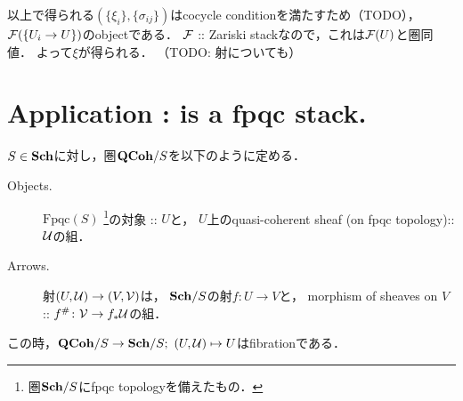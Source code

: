 \documentclass[a4paper, dvipdfmx]{jsarticle}
\begin{document}
    以上で得られる$(\{\xi_i\}, \{\sigma_{ij}\})$はcocycle conditionを満たすため（TODO），
    $\mathcal{F}(\{U_i \to U\})$のobjectである．
    $\mathcal{F}$ :: Zariski stackなので，これは$\mathcal{F}(U)$と圏同値．
    よって$\xi$が得られる．
    （TODO: 射についても）

\section{Application :  is a fpqc stack.}

    \begin{Def}
    $S \in \mathbf{Sch}$に対し，圏$\mathbf{QCoh}/S$を以下のように定める．
    \begin{description}
        \item[Objects.] \mnewline
            $\mathrm{Fpqc}(S)$
            \footnote{圏$\mathbf{Sch}/S$にfpqc topologyを備えたもの．}の対象 :: $U$と，
            $U$上のquasi-coherent sheaf (on fpqc topology):: $\mathcal{U}$の組．
        \item[Arrows.] \mnewline
            射$(U, \mathcal{U}) \to (V, \mathcal{V})$は，
            $\mathbf{Sch}/S$の射$f \colon U \to V$と，
            morphism of sheaves on $V$ :: $f^{\#} \colon \mathcal{V} \to f_*\mathcal{U}$の組．
    \end{description}
    この時，$\mathbf{QCoh}/S \to \mathbf{Sch}/S; \ (U, \mathcal{U}) \mapsto U$はfibrationである．
    \end{Def}


    
\end{document}
